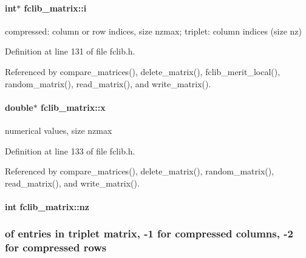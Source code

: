 \hypertarget{structfclib__matrix_aed86c681657206e7502450e437dba667}{}
\paragraph[{i}]{\setlength{\rightskip}{0pt plus 5cm}int$\ast$ fclib\+\_\+matrix\+::i}\label{structfclib__matrix_aed86c681657206e7502450e437dba667}


compressed\+: column or row indices, size nzmax; triplet\+: column indices (size nz) 



Definition at line 131 of file fclib.\+h.



Referenced by compare\+\_\+matrices(), delete\+\_\+matrix(), fclib\+\_\+merit\+\_\+local(), random\+\_\+matrix(), read\+\_\+matrix(), and write\+\_\+matrix().

\hypertarget{structfclib__matrix_aba1891f51a81f973249456c91715e06d}{}
\paragraph[{x}]{\setlength{\rightskip}{0pt plus 5cm}double$\ast$ fclib\+\_\+matrix\+::x}\label{structfclib__matrix_aba1891f51a81f973249456c91715e06d}


numerical values, size nzmax 



Definition at line 133 of file fclib.\+h.



Referenced by compare\+\_\+matrices(), delete\+\_\+matrix(), random\+\_\+matrix(), read\+\_\+matrix(), and write\+\_\+matrix().

\hypertarget{structfclib__matrix_a7d64a7cddc93a8e1f96ab32e9afe0bbb}{}
\paragraph[{nz}]{\setlength{\rightskip}{0pt plus 5cm}int fclib\+\_\+matrix\+::nz}\label{structfclib__matrix_a7d64a7cddc93a8e1f96ab32e9afe0bbb}


\subsubsection*{of entries in triplet matrix, -\/1 for compressed columns, -\/2 for compressed rows}



